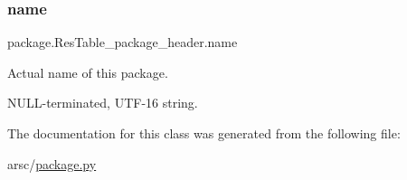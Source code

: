 \subsubsection{\texorpdfstring{name}{name}}
{\footnotesize\ttfamily package.\+Res\+Table\+\_\+package\+\_\+header.\+name}



Actual name of this package. 

N\+U\+L\+L-\/terminated, U\+T\+F-\/16 string. 

The documentation for this class was generated from the following file\+:\begin{DoxyCompactItemize}
\item 
arsc/\mbox{\hyperlink{package_8py}{package.\+py}}\end{DoxyCompactItemize}
